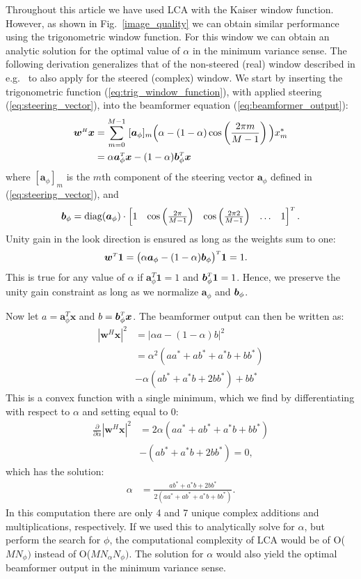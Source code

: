 \documentclass[10pt,journal,draftclsnofoot,onecolumn]{IEEEtran}
\newcommand\Fig[1]{Fig.~\ref{#1}}
\newcommand\nn{\nonumber\\}
\newcommand\sumb[2]{\sum\limits_{#1}^{#2}\;}
\newcommand\T{^{\scriptscriptstyle T}}
\renewcommand\H{^{\scriptscriptstyle H}}
\renewcommand\vec[1]{\boldsymbol{#1}}
\newcommand\1{\vec 1}
\renewcommand*\a{\vec a}
\newcommand*\w{\vec w}
\newcommand*\x{\vec x}
\begin{document}
Throughout this article we have used LCA with the Kaiser window function. However, as shown in \Fig{image_quality} we can obtain similar performance using the trigonometric window function. For this window we can obtain an analytic solution for the optimal value of $\alpha$ in the minimum variance sense. The following derivation generalizes that of the non-steered (real) window described in e.g.~\cite{Stoica2005} to also apply for the steered (complex) window. We start by inserting the trigonometric function (\ref{eq:trig_window_function}), with applied steering (\ref{eq:steering_vector}), into the beamformer equation (\ref{eq:beamformer_output}):
%
\begin{align}
\w\H\x &= \sumb{m=0}{M-1} [\a_\phi]_m\Big(\alpha - (1-\alpha)\cos\left(\frac{2\pi m}{M-1}\right)\Big) x_m^* \nn
&= \alpha \a_\phi\T\x - (1-\alpha)\b_\phi\T\x
\end{align}
%
where $[\a_\phi]_m$ is the $m$th component of the steering vector $\a_\phi$ defined in (\ref{eq:steering_vector}), and 
%
\begin{align}
\b_\phi = \text{diag}(\a_\phi)\cdot\begin{bmatrix}
     1 &
     \cos\left(\frac{2\pi}{M-1}\right) &
     \cos\left(\frac{2\pi 2}{M-1}\right) &
     \hdots &
     1
     \end{bmatrix}\T.
\end{align}
%
Unity gain in the look direction is ensured as long as the weights sum to one:
%
\begin{align}
\w\T\1 &= \big(\alpha\a_\phi - (1-\alpha)\b_\phi\big)\T\1 = 1.
\end{align}
%
This is true for any value of $\alpha$ if $\a_\phi\T\1 = 1$ and $\b_\phi\T\1 = 1$. Hence, we  preserve the unity gain constraint as long as we normalize $\a_\phi$ and $\b_\phi$.

Now let $a=\a_\phi\T\x$ and $b=\b_\phi\T\x$. The beamformer output can then be written as:
%
\begin{align}
|\w\H\x|^2 &= \Big| \alpha a - (1-\alpha)b \Big|^2 \nn
&= \alpha^2 (aa^* + ab^* + a^*b + bb^*) \nn
&- \alpha(ab^* + a^*b + 2bb^*) + bb^*
\end{align}
%
This is a convex function with a single minimum, which we find by differentiating with respect to $\alpha$ and setting equal to 0:
%
\begin{align}
\frac{\partial}{\partial\alpha} |\w\H\x|^2 
&= 2\alpha (aa^* + ab^* + a^*b + bb^*) \nn
&- (ab^* + a^*b + 2bb^*) = 0,
\end{align}
%
which has the solution:
%
\begin{align}
\alpha &= \frac{ab^* + a^*b + 2bb^*}{2(aa^* + ab^* + a^*b + bb^*)}.
\end{align}
%
In this computation there are only 4 and 7 unique complex additions and multiplications, respectively. If we used this to analytically solve for $\alpha$, but perform the search for $\phi$, the computational complexity of LCA would be of O($MN_\phi)$ instead of O($MN_\alpha N_\phi)$. The solution for $\alpha$ would also yield the optimal beamformer output in the minimum variance sense.
\end{document}
